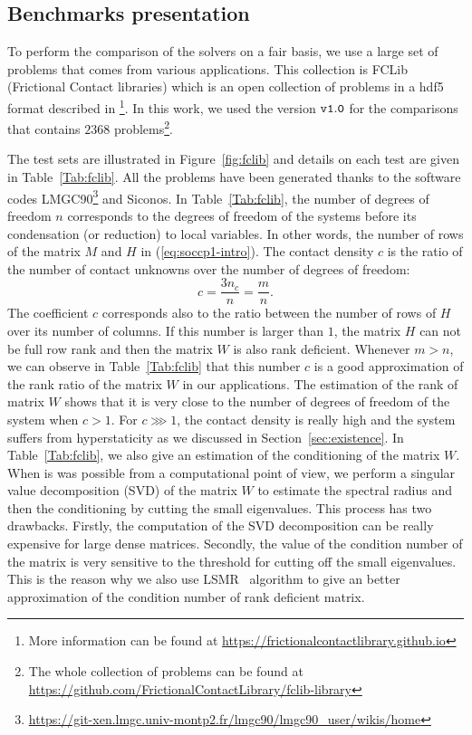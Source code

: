 \subsection{Benchmarks presentation}


To perform the comparison of the solvers on a fair basis, we use a large set of problems that comes from various applications. This collection is FCLib (Frictional Contact libraries)  which is an open collection of problems in a hdf5 format described in \citep{acary:hal-00945820}\footnote{More information can be found at \href{https://frictionalcontactlibrary.github.io}{https://frictionalcontactlibrary.github.io}}. In this work, we used the version $\tt v1.0$ for the comparisons that contains $2368$ problems\footnote{
The whole collection of problems can be found at \href{https://github.com/FrictionalContactLibrary/fclib-library}{https://github.com/FrictionalContactLibrary/fclib-library}}.

The test sets are illustrated in Figure~\ref{fig:fclib} and details on each test are given in Table~\ref{Tab:fclib}. All the problems have been generated thanks to the software codes LMGC90\footnote{\url{https://git-xen.lmgc.univ-montp2.fr/lmgc90/lmgc90_user/wikis/home}} and Siconos. In Table~\ref{Tab:fclib}, the number of degrees of freedom $n$ corresponds to the degrees of freedom of the systems before its condensation (or reduction) to local variables. In other words, the number of rows of the matrix $M$ and $H$ in  (\ref{eq:soccp1-intro}). The contact density $c$ is the ratio of the number of contact unknowns over the number of degrees of freedom:
\begin{equation}
  \label{eq:fclib-1}
  c= \frac {3 n_c }{ n} = \frac {m} {n}.
\end{equation}
 The coefficient $c$ corresponds also to the ratio between the number of rows of $H$ over its number of columns. If this number is larger than $1$, the matrix $H$ can not be full row rank and then the matrix $W$ is also rank deficient. Whenever $m >n$, we can observe in Table~\ref{Tab:fclib} that  this number $c$ is a good approximation of the rank ratio of the matrix $W$ in our applications. The estimation of the rank of matrix $W$ shows that it is very close to the number of degrees of freedom of the system when $c>1$. For $c \ggg 1$, the contact density is really high and the system suffers from hyperstaticity as we discussed in Section~\ref{sec:existence}. In Table~\ref{Tab:fclib}, we also give an estimation of the conditioning of the matrix $W$. When is was possible from a computational point of view, we perform a singular value decomposition (SVD) of the matrix $W$ to estimate the spectral radius and then the conditioning by cutting the small eigenvalues. This process has two drawbacks. Firstly, the computation of the SVD decomposition can be really expensive for large dense matrices. Secondly, the value of the condition number of the matrix is very sensitive to the threshold for cutting off the small eigenvalues. This is the reason why we also use LSMR~\citep{Fong.Saunders_SISC2011} algorithm to give an better approximation of the condition number of rank deficient matrix. 

